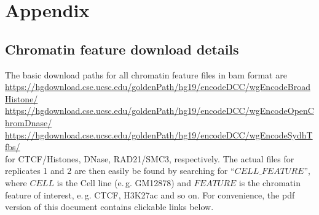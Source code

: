 \section{Appendix}

\subsection{Chromatin feature download details} \label{sec:chromFeat_download_links}
The basic download paths for all chromatin feature files in bam format are\\
\small{\url{https://hgdownload.cse.ucsc.edu/goldenPath/hg19/encodeDCC/wgEncodeBroadHistone/}}\\
\small{\url{https://hgdownload.cse.ucsc.edu/goldenPath/hg19/encodeDCC/wgEncodeOpenChromDnase/}}\\
\small{\url{https://hgdownload.cse.ucsc.edu/goldenPath/hg19/encodeDCC/wgEncodeSydhTfbs/}}\\
for CTCF/Histones, DNase, RAD21/SMC3, respectively. 
The actual files for replicates 1 and 2 are then easily be found by searching for ``$\mathit{CELL}\_\mathit{FEATURE}$'', 
where $\mathit{CELL}$ is the Cell line (e.\,g. GM12878) and $\mathit{FEATURE}$
is the chromatin feature of interest, e.\,g. CTCF, H3K27ac and so on.
For convenience, the pdf version of this document contains clickable links below.

